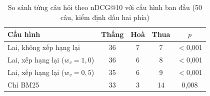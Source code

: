 \begin{table}[H]
\centering
\small
\caption{So sánh từng câu hỏi theo nDCG@10 với cấu hình ban đầu (50 câu, kiểm định dấu hai phía)}
\label{tab:pl_sign}
\begin{tabular}{|L{6.4cm}|c|c|c|c|}
\hline
\textbf{Cấu hình} & \textbf{Thắng} & \textbf{Hoà} & \textbf{Thua} & \textbf{$p$} \\ \hline
Lai, không xếp hạng lại & 36 & 7 & 7 & $<$0{,}001 \\ \hline
Lai, xếp hạng lại ($w_{v}=1{,}0$) & 36 & 6 & 8 & $<$0{,}001 \\ \hline
Lai, xếp hạng lại ($w_{v}=0{,}5$) & 35 & 6 & 9 & $<$0{,}001 \\ \hline
Chỉ BM25 & 33 & 3 & 14 & 0{,}008 \\ \hline
\end{tabular}
\end{table}
